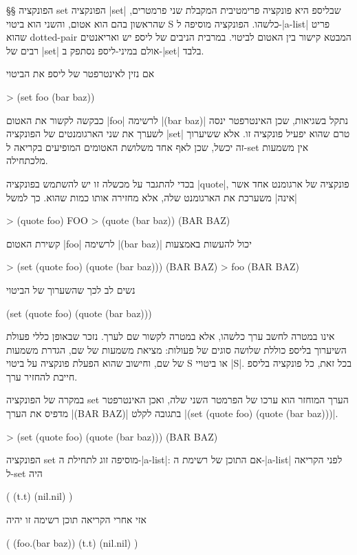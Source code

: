 §§ הפונקציה set
הפונקציה \T|set| שבליספ היא פונקציה פרימטיבית המקבלת שני פרמטרים, שהראשון בהם
הוא אטום, והשני הוא ביטוי S כלשהו. הפונקציה מוסיפה ל-\E|a-list| פריט שהוא
dotted-pair
המבטא קישור בין האטום לביטוי. במרבית הניבים של ליספ יש ואריאנטים רבים של
\T|set| אולם במיני-ליספ נסתפק ב-\T|set| בלבד.

אם נזין לאינטרפטר של ליספ את הביטוי
\begin{LISP}
> (set foo (bar baz))
\end{LISP}
כבקשה לקשור את האטום \T|foo| לרשימה \T|(bar baz)|
נתקל בשגיאות, שכן האינטרפטר ינסה לשערך את שני הארגומנטים של הפונקציה \E|set|
טרם שהוא יפעיל פונקציה זו. אלא ששיערוך זה יכשל, שכן לאף אחד משלושת האטומים
המופיעים בקריאה ל-set אין משמעות מלכתחילה.

בכדי להתגבר על מכשלה זו יש להשתמש בפונקציה \T|quote|, פונקציה של ארגומנט אחד
אשר \ע|אינה| משערכת את הארגומנט שלה, אלא מחזירה אותו כמות שהוא.
כך למשל
\begin{LISP}
> (quote foo)
FOO
> (quote (bar baz))
(BAR BAZ)
\end{LISP}
קשירת האטום \T|foo| לרשימה \T|(bar baz)| יכול להעשות באמצעות
\begin{LISP}
> (set (quote foo) (quote (bar baz)))
(BAR BAZ)
> foo
(BAR BAZ)
\end{LISP}
נשים לב לכך שהשערוך של הביטוי
\begin{LISP}
(set (quote foo) (quote (bar baz)))
\end{LISP}
אינו במטרה לחשב ערך כלשהו, אלא במטרה לקשור שם לערך. נזכר שבאופן כללי פעולת
השיערוך בליספ כוללת שלושה סוגים של פעולות: מציאת משמעות של שם, הגדרת
משמעות של שם, וחישוב שהוא הפעלת פונקציה על ביטוי S או ביטויי \E|S|.
בכל זאת, כל פונקציה בליספ חייבת להחזיר ערך.

במקרה של הפונקציה set הערך המוחזר הוא ערכו של הפרמטר השני שלה, ואכן האינטרפטר
מדפיס את הערך \T|(BAR BAZ)| בתגובה לקלט \T|(set (quote foo) (quote (bar
baz)))|.

\begin{LISP}
> (set (quote foo) (quote (bar baz)))
(BAR BAZ)
\end{LISP}

הפונקציה set מוסיפה זוג לתחילת ה-\E|a-list|: אם התוכן של רשימת ה-\E|a-list|
לפני הקריאה ל-set היה \begin{LISP}
(
  (t.t)
  (nil.nil)
)
\end{LISP}

\minipage\textwidth
אזי אחרי הקריאה תוכן רשימה זו יהיה
\begin{LISP}
(
  (foo.(bar baz))
  (t.t)
  (nil.nil)
)
\end{LISP}
\endminipage

